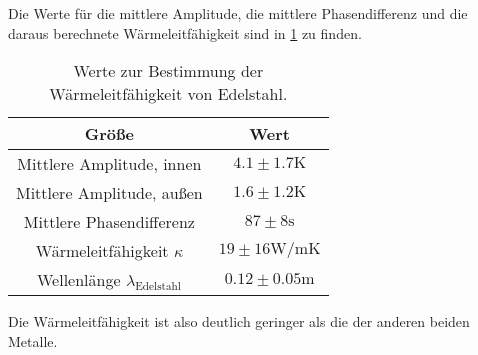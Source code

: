   \FloatBarrier

  \noindent Die Werte für die mittlere Amplitude, die mittlere Phasendifferenz und die daraus berechnete Wärmeleitfähigkeit sind in \ref{tab:gehsterben} zu finden.

  \begin{table}
    \centering
    \caption{Werte zur Bestimmung der Wärmeleitfähigkeit von Edelstahl.}
    \label{tab:gehsterben}
    \begin{tabular}{c c }
      \toprule
      Größe & Wert \\
      \midrule %
      Mittlere Amplitude, innen & $4.1 \pm 1.7 \si{\kelvin}$\\
      Mittlere Amplitude, außen & $1.6 \pm 1.2 \si{\kelvin}$\\
      Mittlere Phasendifferenz & $ 87 \pm 8\si{\s}$ \\%
      Wärmeleitfähigkeit $\kappa$ & $19 \pm 16 \si{\watt\per\m\kelvin}$ \\ %
      Wellenlänge $\lambda_{\text{Edelstahl}}$ & $0.12 \pm 0.05 \si{\m}$\\
      \bottomrule
    \end{tabular}
  \end{table}

  \FloatBarrier
  \noindent Die Wärmeleitfähigkeit ist also deutlich geringer als die der anderen beiden Metalle.